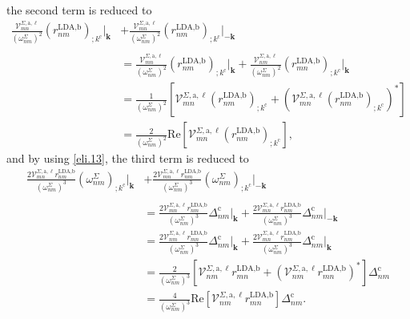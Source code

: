 the second term is reduced to
\begin{align}\label{second_term_gen_deriv}
    \frac{\mathcal{V}^{\Sigma,\text{a},\ell}_{mn}}{(\omega^{\Sigma}_{nm})^{2}}
    \left(r^{\text{LDA,b}}_{nm}\right)_{;k^{\text{c}}}\vert_{\mathbf{k}}
&+  \frac{\mathcal{V}^{\Sigma,\text{a},\ell}_{mn}}{(\omega^{\Sigma}_{nm})^{2}}
    \left(r^{\text{LDA,b}}_{nm}\right)_{;k^{\text{c}}}\vert_{-\mathbf{k}}
    \nonumber\\\nonumber\\
&=  \frac{\mathcal{V}^{\Sigma,\text{a},\ell}_{mn}}{(\omega^{\Sigma}_{nm})^{2}}
    \left(r^{\text{LDA,b}}_{nm}\right)_{;k^{\text{c}}}\vert_{\mathbf{k}}
+   \frac{\mathcal{V}^{\Sigma,\text{a},\ell}_{nm}}{(\omega^{\Sigma}_{nm})^{2}}
    \left(r^{\text{LDA,b}}_{mn}\right)_{;k^{\text{c}}}\vert_{\mathbf{k}}
    \nonumber\\
&=  \frac{1}{(\omega^{\Sigma}_{nm})^{2}}
    \left[\mathcal{V}^{\Sigma,\text{a},\ell}_{mn}
    \left(r^{\text{LDA,b}}_{nm}\right)_{;k^{\text{c}}}
+   \left(\mathcal{V}^{\Sigma,\text{a},\ell}_{mn}
    \left(r^{\text{LDA,b}}_{nm}\right)_{;k^{\text{c}}}\right)^{*}\right]
    \nonumber\\
&=  \frac{2}{(\omega^{\Sigma}_{nm})^{2}}\mathrm{Re}
    \left[\mathcal{V}^{\Sigma,\text{a},\ell}_{mn}
    \left(r^{\text{LDA,b}}_{nm}\right)_{;k^{\text{c}}}\right],
\end{align}
and by using \eqref{eli.13}, the third term is reduced to
\begin{align}\label{third_term_gen_deriv}
    \frac{2\mathcal{V}^{\Sigma,\text{a},\ell}_{mn}
    r^{\text{LDA,b}}_{nm}}{(\omega^{\Sigma}_{nm})^{3}}
    \left(\omega^{\Sigma}_{nm}\right)_{;k^{\text{c}}}\vert_{\mathbf{k}}
&+  \frac{2\mathcal{V}^{\Sigma,\text{a},\ell}_{mn}
    r^{\text{LDA,b}}_{nm}}{(\omega^{\Sigma}_{nm})^{3}}
    \left(\omega^{\Sigma}_{nm}\right)_{;k^{\text{c}}}\vert_{-\mathbf{k}}
    \nonumber\\\nonumber\\
&=  \frac{2\mathcal{V}^{\Sigma,\text{a},\ell}_{mn}
    r^{\text{LDA,b}}_{nm}}{(\omega^{\Sigma}_{nm})^{3}}
    \Delta_{nm}^{\text{c}}\vert_{\mathbf{k}}
+   \frac{2\mathcal{V}^{\Sigma,\text{a},\ell}_{mn}
    r^{\text{LDA,b}}_{nm}}{(\omega^{\Sigma}_{nm})^{3}}
    \Delta_{nm}^{\text{c}}\vert_{-\mathbf{k}}\nonumber\\
&=  \frac{2\mathcal{V}^{\Sigma,\text{a},\ell}_{nm}
    r^{\text{LDA,b}}_{mn}}{(\omega^{\Sigma}_{nm})^{3}}
    \Delta_{nm}^{\text{c}}\vert_{\mathbf{k}}
+   \frac{2\mathcal{V}^{\Sigma,\text{a},\ell}_{mn}
    r^{\text{LDA,b}}_{nm}}{(\omega^{\Sigma}_{nm})^{3}}
    \Delta_{nm}^{\text{c}}\vert_{\mathbf{k}}\nonumber\\
&=  \frac{2}{(\omega^{\Sigma}_{nm})^{3}}
    \left[\mathcal{V}^{\Sigma,\text{a},\ell}_{nm}r^{\text{LDA,b}}_{mn}
+   \left(\mathcal{V}^{\Sigma,\text{a},\ell}_{nm}
    r^{\text{LDA,b}}_{mn}\right)^{*}\right]\Delta_{nm}^{\text{c}}\nonumber\\
&=  \frac{4}{(\omega^{\Sigma}_{nm})^{3}}\mathrm{Re}
    \left[\mathcal{V}^{\Sigma,\text{a},\ell}_{nm}r^{\text{LDA,b}}_{mn}\right]
    \Delta_{nm}^{\text{c}}.
\end{align}


